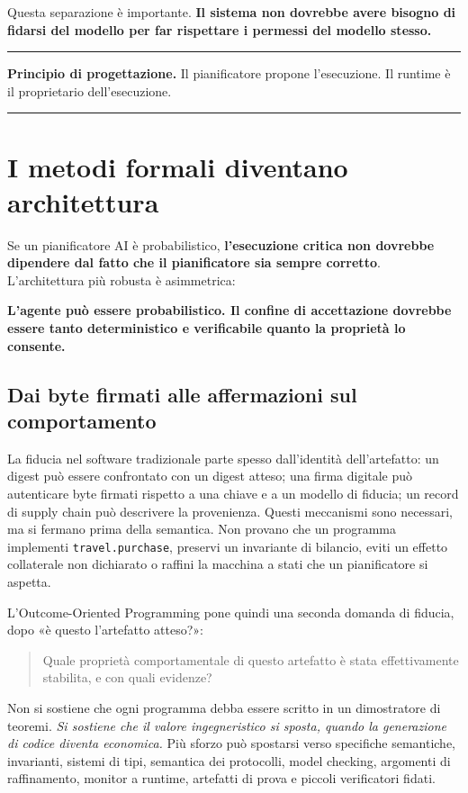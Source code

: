 \documentclass[10pt,oneside,openany]{book}
\newcommand{\principle}[1]{%
  \vspace{4pt}
  \noindent\begin{minipage}{\linewidth}
  \hrule\vspace{5pt}
  \small\sffamily\raggedright\textbf{Principio di progettazione.} #1
  \vspace{5pt}\hrule
  \end{minipage}\vspace{4pt}
}
\newcommand{\mono}[1]{\texttt{#1}}
\begin{document}
Questa separazione è importante. \textbf{Il sistema non dovrebbe avere bisogno di fidarsi del modello per far rispettare i permessi del modello stesso.}

\principle{Il pianificatore propone l'esecuzione. Il runtime è il proprietario dell'esecuzione.}


\chapter{I metodi formali diventano architettura}\label{ch:formal}

Se un pianificatore AI è probabilistico, \textbf{l'esecuzione critica non dovrebbe dipendere dal fatto che il pianificatore sia sempre corretto}. L'architettura più robusta è asimmetrica:

\begin{center}
\sffamily\bfseries
L'agente può essere probabilistico. Il confine di accettazione dovrebbe essere tanto deterministico e verificabile quanto la proprietà lo consente.
\end{center}

\section{Dai byte firmati alle affermazioni sul comportamento}
La fiducia nel software tradizionale parte spesso dall'identità dell'artefatto: un digest può essere confrontato con un digest atteso; una firma digitale può autenticare byte firmati rispetto a una chiave e a un modello di fiducia; un record di supply chain può descrivere la provenienza. Questi meccanismi sono necessari, ma si fermano prima della semantica. Non provano che un programma implementi \mono{travel.purchase}, preservi un invariante di bilancio, eviti un effetto collaterale non dichiarato o raffini la macchina a stati che un pianificatore si aspetta.

L'Outcome-Oriented Programming pone quindi una seconda domanda di fiducia, dopo «è questo l'artefatto atteso?»:

\begin{quote}
Quale proprietà comportamentale di questo artefatto è stata effettivamente stabilita, e con quali evidenze?
\end{quote}

Non si sostiene che ogni programma debba essere scritto in un dimostratore di teoremi. \emph{Si sostiene che il valore ingegneristico si sposta, quando la generazione di codice diventa economica.} Più sforzo può spostarsi verso specifiche semantiche, invarianti, sistemi di tipi, semantica dei protocolli, model checking, argomenti di raffinamento, monitor a runtime, artefatti di prova e piccoli verificatori fidati.
\end{document}
